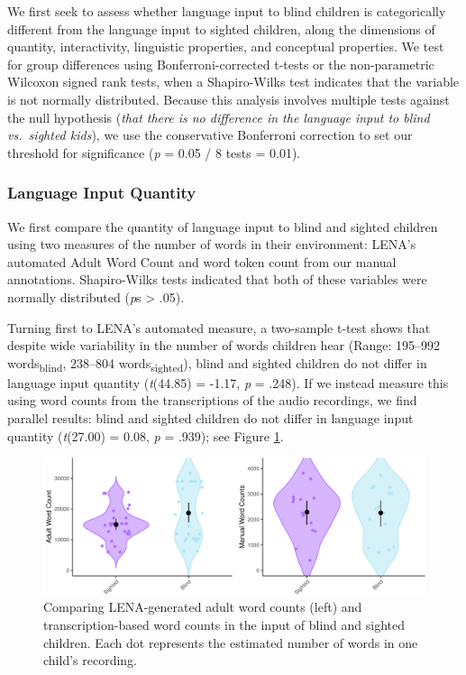\documentclass[
  man,floatsintext]{apa6}
\begin{document}
We first seek to assess whether language input to blind children is categorically different from the language input to sighted children, along the dimensions of quantity, interactivity, linguistic properties, and conceptual properties. We test for group differences using Bonferroni-corrected t-tests or the non-parametric Wilcoxon signed rank tests, when a Shapiro-Wilks test indicates that the variable is not normally distributed. Because this analysis involves multiple tests against the null hypothesis (\emph{that there is no difference in the language input to blind vs.~sighted kids}), we use the conservative Bonferroni correction to set our threshold for significance (\emph{p} = 0.05 / 8 tests = 0.01).

\hypertarget{language-input-quantity}{%
\subsubsection{Language Input Quantity}\label{language-input-quantity}}

We first compare the quantity of language input to blind and sighted children using two measures of the number of words in their environment: LENA's automated Adult Word Count and word token count from our manual annotations. Shapiro-Wilks tests indicated that both of these variables were normally distributed (\emph{p}s \textgreater{} .05).

Turning first to LENA's automated measure, a two-sample t-test shows that despite wide variability in the number of words children hear (Range: 195--992 words\textsubscript{blind}, 238--804 words\textsubscript{sighted}), blind and sighted children do not differ in language input quantity (\emph{t}(44.85) = -1.17, \emph{p} = .248). If we instead measure this using word counts from the transcriptions of the audio recordings, we find parallel results: blind and sighted children do not differ in language input quantity (\emph{t}(27.00) = 0.08, \emph{p} = .939); see Figure \ref{fig:quantity-plots}.

\begin{figure}
\centering
\includegraphics{input_quality_manuscript_files/figure-latex/quantity-plots-1.pdf}
\caption{\label{fig:quantity-plots}Comparing LENA-generated adult word counts (left) and transcription-based word counts in the input of blind and sighted children. Each dot represents the estimated number of words in one child's recording.}
\end{figure}
\end{document}
